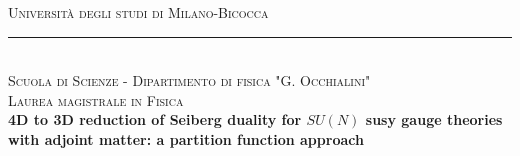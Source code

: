 

\begin{titlepage}

\center %
 
\textsc{\Large Università degli studi di %
 Milano-Bicocca}
\\
\rule{\linewidth}{0.8pt} 
\\[0.3cm]


\vspace{0.3cm} %
\textsc{\large Scuola di Scienze - Dipartimento di fisica "G. Occhialini"}\\%
\vspace{1cm}
\textsc{\LARGE Laurea magistrale in Fisica}\\ %


\vspace{1.3cm}
{ \LARGE \bfseries \boldmath 4D to 3D reduction of Seiberg duality for $SU(N)$ susy gauge theories with adjoint matter: a partition function approach}\\ %


\end{titlepage}
